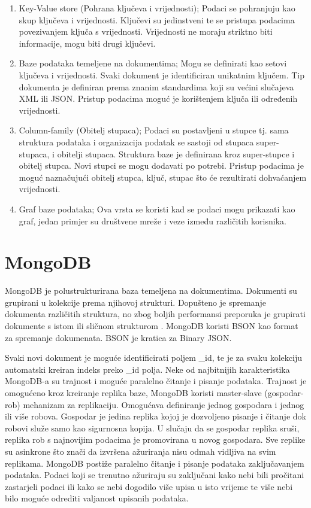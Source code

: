 \documentclass[]{foi}
\begin{document}
\begin{enumerate}
	\item Key-Value store (Pohrana ključeva i vrijednosti); Podaci se pohranjuju kao skup ključeva i vrijednosti.
	      Ključevi su jedinstveni te se pristupa podacima povezivanjem ključa s vrijednosti.
	      Vrijednosti ne moraju striktno biti informacije, mogu biti drugi ključevi.
	\item Baze podataka temeljene na dokumentima; Mogu se definirati kao setovi ključeva i vrijednosti.
	      Svaki dokument je identificiran unikatnim ključem. Tip dokumenta je definiran prema znanim standardima
	      koji su većini slučajeva XML ili JSON. Pristup podacima moguć je korištenjem ključa ili određenih vrijednosti.
	\item Column-family (Obitelj stupaca); Podaci su postavljeni u stupce tj. sama struktura podataka i organizacija podatak
	      se sastoji od stupaca super-stupaca, i obitelji stupaca. Struktura baze je definirana kroz super-stupce i obitelj stupca.
	      Novi stupci se mogu dodavati po potrebi. Pristup podacima je moguć naznačujući obitelj stupca, ključ, stupac što će
	      rezultirati dohvaćanjem vrijednosti.
	\item Graf baze podataka; Ova vrsta se koristi kad se podaci mogu prikazati kao graf, jedan primjer su društvene mreže
	      i veze između različitih korisnika.
\end{enumerate}

\section{MongoDB}

MongoDB je polustrukturirana baza temeljena na dokumentima. Dokumenti su grupirani u kolekcije prema njihovoj strukturi.
Dopušteno je spremanje dokumenta različitih struktura, no zbog boljih performansi preporuka je grupirati dokumente s
istom ili sličnom strukturom \cite{abramova2013nosql}. MongoDB koristi BSON kao format za spremanje dokumenata. BSON je kratica za Binary JSON.

Svaki novi dokument je moguće identificirati poljem \_id, te je za svaku kolekciju automatski kreiran indeks preko \_id polja.
Neke od najbitnijih karakteristika MongoDB-a su trajnost i moguće paralelno čitanje i pisanje podataka.
Trajnost je omogućeno kroz kreiranje replika baze, MongoDB koristi master-slave (gospodar-rob) mehanizam za replikaciju.
Omogućava definiranje jednog gospodara i jednog ili više robova. Gospodar je jedina replika kojoj je dozvoljeno pisanje i čitanje
dok robovi služe samo kao sigurnosna kopija. U slučaju da se gospodar replika sruši, replika rob s najnovijim podacima je promovirana
u novog gospodara. Sve replike su asinkrone što znači da izvršena ažuriranja nisu odmah vidljiva na svim replikama.
MongoDB postiže paralelno čitanje i pisanje podataka zaključavanjem podataka. Podaci koji se trenutno ažuriraju su zaključani
kako nebi bili pročitani zastarjeli podaci ili kako se nebi dogodilo više upisa u isto vrijeme te više nebi bilo moguće
odrediti valjanost upisanih podataka.
\end{document}
